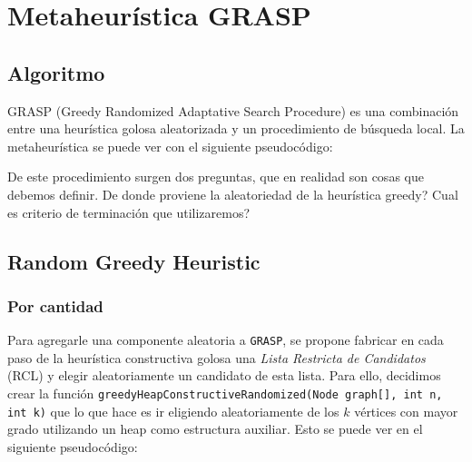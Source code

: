 \section{Metaheurística GRASP}

\subsection{Algoritmo}

GRASP (Greedy Randomized Adaptative Search Procedure) es una combinación entre una heurística golosa aleatorizada y un procedimiento de búsqueda local. La metaheurística se puede ver con el siguiente pseudocódigo:

\begin{algorithmic}
	\EndIf
\EndWhile
\EndProcedure
\end{algorithmic}

De este procedimiento surgen dos preguntas, que en realidad son cosas que debemos definir. De donde proviene la aleatoriedad de la heurística greedy? Cual es criterio de terminación que utilizaremos?

\subsection{Random Greedy Heuristic}

\subsubsection{Por cantidad}

Para agregarle una componente aleatoria a \texttt{GRASP}, se propone fabricar en cada paso de la heurística constructiva golosa una \textit{Lista Restricta de Candidatos} (RCL) y elegir aleatoriamente un candidato de esta lista. Para ello, decidimos crear la función \texttt{greedyHeapConstructiveRandomized(Node graph[], int n, int k)} que lo que hace es ir eligiendo aleatoriamente de  los $k$ vértices con mayor grado utilizando un heap como estructura auxiliar. Esto se puede ver en el siguiente pseudocódigo:

\begin{algorithmic}


	\EndIf
	
	\EndFor
\EndWhile
\EndProcedure
\end{algorithmic}

